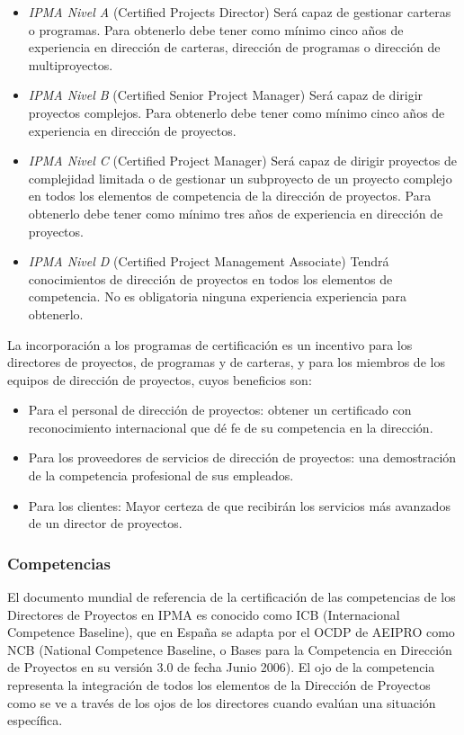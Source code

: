 \begin{itemize}
	\item \emph{IPMA Nivel A} (Certified Projects Director) Será capaz de gestionar carteras o programas. Para obtenerlo debe tener como mínimo cinco años de experiencia en dirección de carteras, dirección de programas o dirección de multiproyectos.
	\item \emph{IPMA Nivel B} (Certified Senior Project Manager) Será capaz de dirigir proyectos complejos. Para obtenerlo debe tener como mínimo cinco años de experiencia en dirección de proyectos.
	\item \emph{IPMA Nivel C} (Certified Project Manager) Será capaz de dirigir proyectos de complejidad limitada o de gestionar un subproyecto de un proyecto complejo en todos los elementos de competencia de la dirección de proyectos. Para obtenerlo debe tener como mínimo tres años de experiencia en dirección de proyectos.
	\item \emph{IPMA Nivel D} (Certified Project Management Associate) Tendrá conocimientos de dirección de proyectos en todos los elementos de competencia. No es obligatoria ninguna experiencia experiencia para obtenerlo.
\end{itemize}

La incorporación a los programas de certificación es un incentivo para los directores de proyectos, de programas y de carteras, y para los miembros de los equipos de dirección de proyectos, cuyos beneficios son:

\begin{itemize}
	\item Para el personal de dirección de proyectos: obtener un certificado con reconocimiento internacional que dé fe de su competencia en la dirección.
	\item Para los proveedores de servicios de dirección de proyectos: una demostración de la competencia profesional de sus empleados.
	\item Para los clientes: Mayor certeza de que recibirán los servicios más avanzados de un director de proyectos.
\end{itemize}

\subsubsection{Competencias}

El documento mundial de referencia de la certificación de las competencias de los Directores de Proyectos en IPMA es conocido como ICB (Internacional Competence Baseline), que en España se adapta por el OCDP de AEIPRO como NCB (National Competence Baseline, o Bases para la Competencia en Dirección de Proyectos en su versión 3.0 de fecha Junio 2006). El ojo de la competencia representa la integración de todos los elementos de la Dirección de Proyectos como se ve a través de los ojos de los directores cuando evalúan una situación específica.\\

